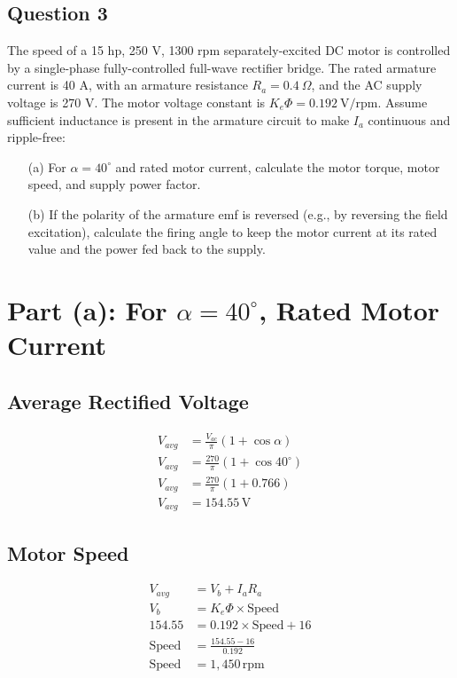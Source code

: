 \documentclass[12pt]{report}
\begin{document}
	\subsection*{Question 3}
	The speed of a 15 hp, 250 V, 1300 rpm separately-excited DC motor is controlled by a single-phase fully-controlled full-wave rectifier bridge. The rated armature current is 40 A, with an armature resistance $R_a = 0.4 \ \Omega$, and the AC supply voltage is 270 V. The motor voltage constant is $K_e \Phi = 0.192 \ \text{V/rpm}$. Assume sufficient inductance is present in the armature circuit to make $I_a$ continuous and ripple-free:
	
	\begin{enumerate}
		\item[(a)] For $\alpha = 40^\circ$ and rated motor current, calculate the motor torque, motor speed, and supply power factor.
		\item[(b)] If the polarity of the armature emf is reversed (e.g., by reversing the field excitation), calculate the firing angle to keep the motor current at its rated value and the power fed back to the supply.
	\end{enumerate}
	
	
	
\section*{Part (a): For \(\alpha = 40^\circ\), Rated Motor Current}

\subsection*{Average Rectified Voltage}
\begin{align*}
	V_{avg} &= \frac{V_{ac}}{\pi} (1 + \cos \alpha) \\
	V_{avg} &= \frac{270}{\pi} (1 + \cos 40^\circ) \\
	V_{avg} &= \frac{270}{\pi} (1 + 0.766) \\
	V_{avg} &= 154.55 \, \text{V}
\end{align*}

\subsection*{Motor Speed}
\begin{align*}
	V_{avg} &= V_b + I_a R_a \\
	V_b &= K_e \Phi \times \text{Speed} \\
	154.55 &= 0.192 \times \text{Speed} + 16 \\
	\text{Speed} &= \frac{154.55 - 16}{0.192} \\
	\text{Speed} &= 1{,}450 \, \text{rpm}
\end{align*}
\end{document}

